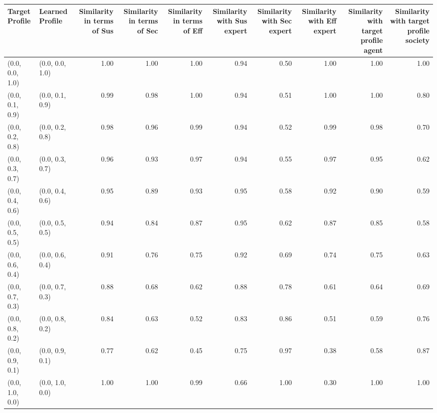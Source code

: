 \begin{tabular}{llrrrrrrrr}
\toprule
Target Profile & Learned Profile & Similarity in terms of Sus & Similarity in terms of Sec & Similarity in terms of Eff & Similarity with Sus expert & Similarity with Sec expert & Similarity with Eff expert & Similarity with target profile agent & Similarity with target profile society \\
\midrule
(0.0, 0.0, 1.0) & (0.0, 0.0, 1.0) & 1.00 & 1.00 & 1.00 & 0.94 & 0.50 & 1.00 & 1.00 & 1.00 \\
(0.0, 0.1, 0.9) & (0.0, 0.1, 0.9) & 0.99 & 0.98 & 1.00 & 0.94 & 0.51 & 1.00 & 1.00 & 0.80 \\
(0.0, 0.2, 0.8) & (0.0, 0.2, 0.8) & 0.98 & 0.96 & 0.99 & 0.94 & 0.52 & 0.99 & 0.98 & 0.70 \\
(0.0, 0.3, 0.7) & (0.0, 0.3, 0.7) & 0.96 & 0.93 & 0.97 & 0.94 & 0.55 & 0.97 & 0.95 & 0.62 \\
(0.0, 0.4, 0.6) & (0.0, 0.4, 0.6) & 0.95 & 0.89 & 0.93 & 0.95 & 0.58 & 0.92 & 0.90 & 0.59 \\
(0.0, 0.5, 0.5) & (0.0, 0.5, 0.5) & 0.94 & 0.84 & 0.87 & 0.95 & 0.62 & 0.87 & 0.85 & 0.58 \\
(0.0, 0.6, 0.4) & (0.0, 0.6, 0.4) & 0.91 & 0.76 & 0.75 & 0.92 & 0.69 & 0.74 & 0.75 & 0.63 \\
(0.0, 0.7, 0.3) & (0.0, 0.7, 0.3) & 0.88 & 0.68 & 0.62 & 0.88 & 0.78 & 0.61 & 0.64 & 0.69 \\
(0.0, 0.8, 0.2) & (0.0, 0.8, 0.2) & 0.84 & 0.63 & 0.52 & 0.83 & 0.86 & 0.51 & 0.59 & 0.76 \\
(0.0, 0.9, 0.1) & (0.0, 0.9, 0.1) & 0.77 & 0.62 & 0.45 & 0.75 & 0.97 & 0.38 & 0.58 & 0.87 \\
(0.0, 1.0, 0.0) & (0.0, 1.0, 0.0) & 1.00 & 1.00 & 0.99 & 0.66 & 1.00 & 0.30 & 1.00 & 1.00 \\
\bottomrule
\end{tabular}
